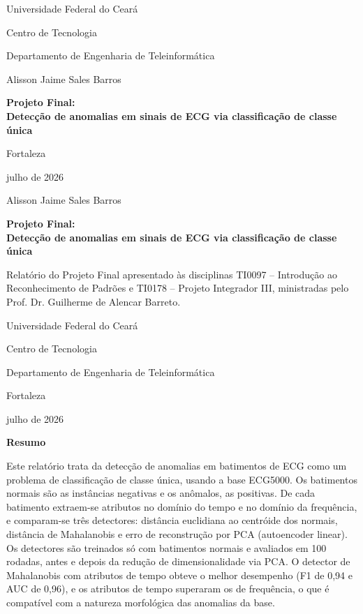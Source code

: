 \documentclass[12pt,a4paper]{scrartcl}
\begin{document}
\begin{titlepage}
\centering
{Universidade Federal do Ceará\par}
{Centro de Tecnologia\par}
{Departamento de Engenharia de Teleinformática\par}
\vspace{2.5cm}
{\sffamily Alisson Jaime Sales Barros\par}
\vfill
{\sffamily\bfseries\large Projeto Final:\\[0.3em]
Detecção de anomalias em sinais de ECG via classificação de classe única\par}
\vfill
{Fortaleza\par}
{julho de 2026\par}
\end{titlepage}

\begin{titlepage}
\centering
{\sffamily Alisson Jaime Sales Barros\par}
\vspace{3cm}
{\sffamily\bfseries\large Projeto Final:\\[0.3em]
Detecção de anomalias em sinais de ECG via classificação de classe única\par}
\vspace{1.5cm}
\hfill\begin{minipage}{0.5\textwidth}
\small Relatório do Projeto Final apresentado às disciplinas TI0097 -- Introdução ao Reconhecimento de Padrões e TI0178 -- Projeto Integrador III, ministradas pelo Prof. Dr. Guilherme de Alencar Barreto.
\end{minipage}
\vfill
{Universidade Federal do Ceará\par}
{Centro de Tecnologia\par}
{Departamento de Engenharia de Teleinformática\par}
\vspace{1cm}
{Fortaleza\par}
{julho de 2026\par}
\end{titlepage}

\begin{center}{\large\sffamily\bfseries Resumo}\end{center}
\noindent Este relatório trata da detecção de anomalias em batimentos de ECG como um problema de classificação de classe única, usando a base ECG5000. Os batimentos normais são as instâncias negativas e os anômalos, as positivas. De cada batimento extraem-se atributos no domínio do tempo e no domínio da frequência, e comparam-se três detectores: distância euclidiana ao centróide dos normais, distância de Mahalanobis e erro de reconstrução por PCA (autoencoder linear). Os detectores são treinados só com batimentos normais e avaliados em 100 rodadas, antes e depois da redução de dimensionalidade via PCA. O detector de Mahalanobis com atributos de tempo obteve o melhor desempenho (F1 de 0,94 e AUC de 0,96), e os atributos de tempo superaram os de frequência, o que é compatível com a natureza morfológica das anomalias da base.
\end{document}
